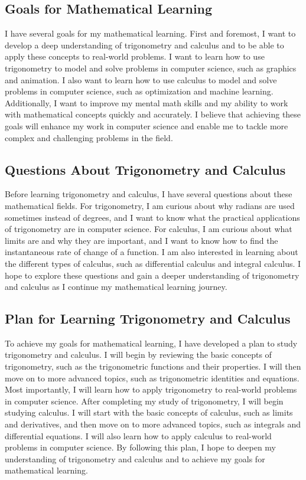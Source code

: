 \subsection{Goals for Mathematical Learning}

I have several goals for my mathematical learning. First and foremost, I want to develop a deep understanding of trigonometry and calculus and to be able to apply these concepts to real-world problems. I want to learn how to use trigonometry to model and solve problems in computer science, such as graphics and animation. I also want to learn how to use calculus to model and solve problems in computer science, such as optimization and machine learning. Additionally, I want to improve my mental math skills and my ability to work with mathematical concepts quickly and accurately. I believe that achieving these goals will enhance my work in computer science and enable me to tackle more complex and challenging problems in the field.

\subsection{Questions About Trigonometry and Calculus}

Before learning trigonometry and calculus, I have several questions about these mathematical fields. For trigonometry, I am curious about why radians are used sometimes instead of degrees, and I want to know what the practical applications of trigonometry are in computer science. For calculus, I am curious about what limits are and why they are important, and I want to know how to find the instantaneous rate of change of a function. I am also interested in learning about the different types of calculus, such as differential calculus and integral calculus. I hope to explore these questions and gain a deeper understanding of trigonometry and calculus as I continue my mathematical learning journey.

\subsection{Plan for Learning Trigonometry and Calculus}

To achieve my goals for mathematical learning, I have developed a plan to study trigonometry and calculus. I will begin by reviewing the basic concepts of trigonometry, such as the trigonometric functions and their properties. I will then move on to more advanced topics, such as trigonometric identities and equations. Most importantly, I will learn how to apply trigonometry to real-world problems in computer science. After completing my study of trigonometry, I will begin studying calculus. I will start with the basic concepts of calculus, such as limits and derivatives, and then move on to more advanced topics, such as integrals and differential equations. I will also learn how to apply calculus to real-world problems in computer science. By following this plan, I hope to deepen my understanding of trigonometry and calculus and to achieve my goals for mathematical learning.